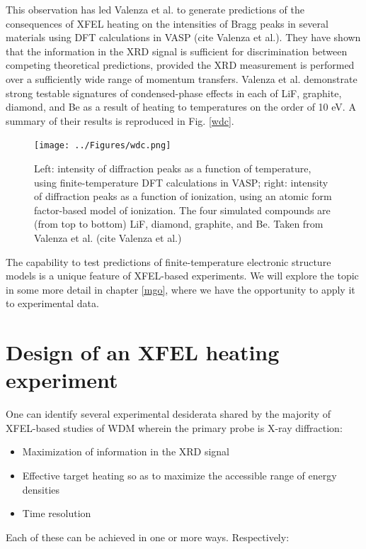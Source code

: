 \documentclass [11pt, proquest, article] {uwthesis}[2016/11/22]
\begin{document}
This observation has led Valenza et al. to generate predictions of the consequences of XFEL heating on the intensities of Bragg peaks in several materials using DFT calculations in VASP (cite Valenza et al.). They have shown that the information in the XRD signal is sufficient for discrimination between competing theoretical predictions, provided the XRD measurement is performed over a sufficiently wide range of momentum transfers. Valenza et al. demonstrate strong testable signatures of condensed-phase effects in each of LiF, graphite, diamond, and Be as a result of heating to temperatures on the order of 10 eV. A summary of their results is reproduced in Fig. \ref{wdc}.

\begin{figure}[h] 
\caption{Left: intensity of diffraction peaks as a function of temperature, using finite-temperature DFT calculations in VASP; right: intensity of diffraction peaks as a function of ionization, using an atomic form factor-based model of ionization. The four simulated compounds are (from top to bottom) LiF, diamond, graphite, and Be. Taken from Valenza et al. (cite Valenza et al.)}
\label{fig:wdc}
\centering
\texttt{[image: ../Figures/wdc.png]}
\end{figure}

The capability to test predictions of finite-temperature electronic structure models is a unique feature of XFEL-based experiments. We will explore the topic in some more detail in chapter \ref{mgo}, where we have the opportunity to apply it to experimental data. 

\section{Design of an XFEL heating experiment}
One can identify several experimental desiderata shared by the majority of XFEL-based studies of WDM wherein the primary probe is X-ray diffraction:

\begin{itemize}
\item{Maximization of information in the XRD signal}
\item{Effective target heating so as to maximize the accessible range of energy densities}
\item{Time resolution}
\end{itemize}

Each of these can be achieved in one or more ways. Respectively:
\end{document}
